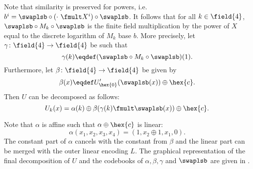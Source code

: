 Note that similarity is preserved for powers, i.e. $b^i = \swaplsb \circ (\cdot~\fmult X^i) \circ \swaplsb$. It follows that for all $k \in \field{4}$, $\swaplsb \circ M_k \circ \swaplsb$ is the finite field multiplication by the power of $X$ equal to the discrete logarithm of $M_k$ base $b$. More precisely, let $\gamma\colon \field{4} \to \field{4}$ be such that 
$$
\gamma(k) \eqdef (\swaplsb \circ M_k \circ \swaplsb)(1).
$$
Furthermore, let $\beta\colon \field{4} \to \field{4}$ be given by
$$
\beta(x) \eqdef U'_{\hex{0}}(\swaplsb(x)) \oplus \hex{c}.
$$
Then $U$ can be decomposed as follows:
$$
U_k(x) = \alpha(k) \oplus \beta(\gamma(k) \fmult \swaplsb(x)) \oplus \hex{c}.
$$

Note that $\alpha$ is affine such that $\alpha \oplus \hex{c}$ is linear:
$$
\alpha(x_1,x_2,x_3,x_4) = (1, x_2 \oplus 1, x_1, 0).
$$
The constant part of $\alpha$ cancels with the constant from $\beta$ and the linear part can be merged with the outer linear encoding $L$. 
The graphical representation of the final decomposition of $U$ and the codebooks of $\alpha, \beta, \gamma$ and $\swaplsb$ are given in .

